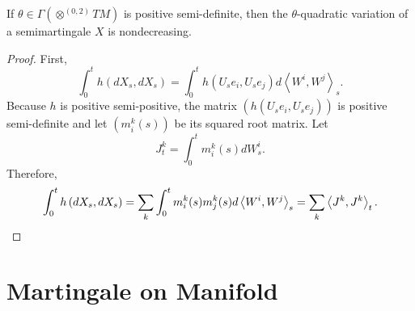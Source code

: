 \begin{prop}
    If $\theta \in \Gamma(\otimes^{(0,2)}TM)$ is positive semi-definite, then the $\theta$-quadratic variation of a semimartingale $X$ is nondecreasing.
\end{prop}
\begin{proof}
    First,
    \begin{equation*}
        \int_0^t h\left(d X_s, d X_s\right)=\int_0^t h\left(U_s e_i, U_s e_j\right) d\left\langle W^i, W^j\right\rangle_s.
    \end{equation*}
    Because $h$ is positive semi-positive, the matrix $\left(h\left(U_s e_i, U_s e_j\right)\right)$ is positive semi-definite and let $(m_i^k(s))$ be its squared root matrix. Let
    \begin{equation*}
        J_t^k=\int_0^t m_i^k(s) d W_s^i.
    \end{equation*}
    Therefore,
    \begin{equation*}
        \int_0^t h\left(d X_s, d X_s\right)= \sum_k \int_0^t m_i^k(s) m_j^k(s) d\left\langle W^i, W^j\right\rangle_s=\sum_k\left\langle J^k, J^k\right\rangle_t.\qedhere
    \end{equation*}
\end{proof}

\section{Martingale on Manifold}

